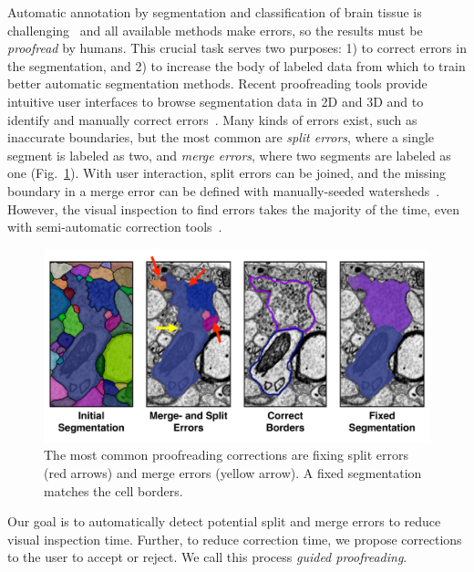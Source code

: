 Automatic annotation by segmentation and classification of brain tissue is
challenging~\cite{isbi_challenge} and all available methods make errors, so 
the results must be \emph{proofread} by humans. This crucial
task serves two purposes: 1) to correct errors in the segmentation, and 2) to
increase the body of labeled data from which to train better automatic
segmentation methods. Recent proofreading tools provide intuitive user
interfaces to browse segmentation data in 2D and 3D and to identify and manually
correct errors~\cite{markus_proofreading,raveler,mojo2,haehn_dojo_2014}. Many
kinds of errors exist, such as inaccurate boundaries, but the most common are
\emph{split errors}, where a single segment is labeled as two, and \emph{merge
errors}, where two segments are labeled as one
(Fig.~\ref{fig:merge_and_slit_errors}). With user interaction, split errors can
be joined, and the missing boundary in a merge error can be defined with
manually-seeded watersheds~\cite{haehn_dojo_2014}. However, the visual
inspection to find errors takes the majority of the time, even with
semi-automatic correction tools~\cite{proofreading_bottleneck}.

\begin{figure}[t]
\begin{center}
  \includegraphics[width=\linewidth]{gfx/merge_and_split_errors.pdf}
\end{center}
\vspace{-4mm}
   \caption{The most common proofreading corrections are fixing split errors (red arrows) and merge errors (yellow arrow). A fixed segmentation matches the cell borders.}
\label{fig:merge_and_slit_errors}
\end{figure}

Our goal is to automatically detect potential split and merge errors to reduce visual
inspection time. Further, to reduce correction time, we propose
corrections to the user to accept or reject. We call this process \textit{guided
proofreading}.

